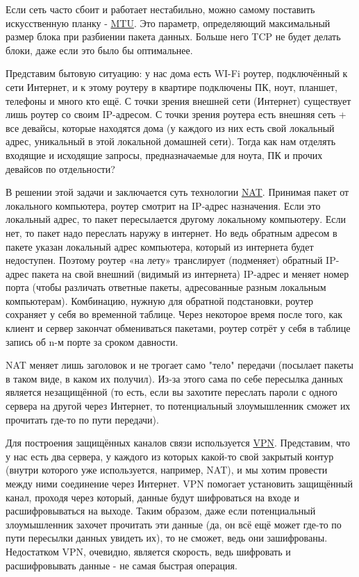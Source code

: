 Если сеть часто сбоит и работает нестабильно, можно самому поставить искусственную планку - \href{https://ru.wikipedia.org/wiki/Maximum_transmission_unit}{MTU}. Это параметр, определяющий максимальный размер блока при разбиении пакета данных. Больше него TCP не будет делать блоки, даже если это было бы оптимальнее.

\bigskip 
Представим бытовую ситуацию: у нас дома есть WI-Fi роутер, подключённый к сети Интернет, и к этому роутеру в квартире подключены ПК, ноут, планшет, телефоны и много кто ещё. С точки зрения внешней сети (Интернет) существует лишь роутер со своим IP-адресом. С точки зрения роутера есть внешняя сеть + все девайсы, которые находятся дома (у каждого из них есть свой локальный адрес, уникальный в этой локальной домашней сети). Тогда как нам отделять входящие и исходящие запросы, предназначаемые для ноута, ПК и прочих девайсов по отдельности?

В решении этой задачи и заключается суть технологии \href{https://ru.wikipedia.org/wiki/NAT}{NAT}. Принимая пакет от локального компьютера, роутер смотрит на IP-адрес назначения. Если это локальный адрес, то пакет пересылается другому локальному компьютеру. Если нет, то пакет надо переслать наружу в интернет. Но ведь обратным адресом в пакете указан локальный адрес компьютера, который из интернета будет недоступен. Поэтому роутер «на лету» транслирует (подменяет) обратный IP-адрес пакета на свой внешний (видимый из интернета) IP-адрес и меняет номер порта (чтобы различать ответные пакеты, адресованные разным локальным компьютерам). Комбинацию, нужную для обратной подстановки, роутер сохраняет у себя во временной таблице. Через некоторое время после того, как клиент и сервер закончат обмениваться пакетами, роутер сотрёт у себя в таблице запись об n-м порте за сроком давности.

NAT меняет лишь заголовок и не трогает само "тело" передачи (посылает пакеты в таком виде, в каком их получил). Из-за этого сама по себе пересылка данных является незащищённой (то есть, если вы захотите переслать пароли с одного сервера на другой через Интернет, то потенциальный злоумышленник сможет их прочитать где-то по пути передачи).

\bigskip    
Для построения защищённых каналов связи используется \href{https://ru.wikipedia.org/wiki/VPN}{VPN}. Представим, что у нас есть два сервера, у каждого из которых какой-то свой закрытый контур (внутри которого уже используется, например, NAT), и мы хотим провести между ними соединение через Интернет. VPN помогает установить защищённый канал, проходя через который, данные будут шифроваться на входе и расшифровываться на выходе.
Таким образом, даже если потенциальный злоумышленник захочет прочитать эти данные (да, он всё ещё может где-то по пути пересылки данных увидеть их), то не сможет, ведь они зашифрованы. Недостатком VPN, очевидно, является скорость, ведь шифровать и расшифровывать данные - не самая быстрая операция.